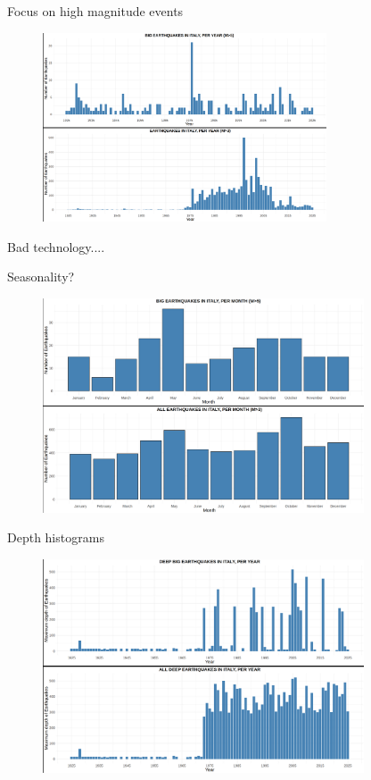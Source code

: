 \documentclass[aspectratio=43]{beamer}
\begin{document}
\begin{frame}{Focus on high magnitude events}
	\begin{figure}[t]
		\centering
		\includegraphics[width=0.75\textwidth]{EQ_images_ben/eq_hist_years.png}
	\end{figure}
	
	\pause
	
	Bad technology.... %
\end{frame}


\begin{frame}{Seasonality?}
	\begin{figure}[t]
		\centering
		\includegraphics[width=0.85\textwidth]{EQ_images_ben/eq_hist_months.png}
	\end{figure}
	
\end{frame}

\begin{frame}{Depth histograms}
	\begin{figure}[t]
		\centering
		\includegraphics[width=0.85\textwidth]{EQ_images_ben/eq_hist_depth_years.png}
	\end{figure}
\end{frame}
\end{document}
